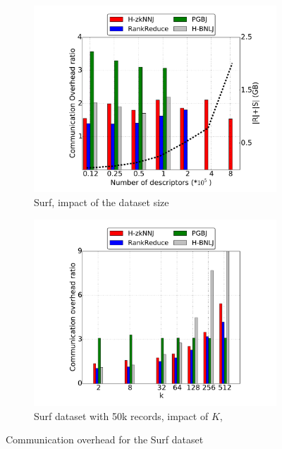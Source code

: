 \documentclass[10pt,journal,compsoc]{IEEEtran}
\begin{document}
\begin{figure}[htp]
	\centering
	\begin{subfigure}[b]{0.48\textwidth}
		\includegraphics[width=\textwidth]{img-perf/surf/data/shuffle.pdf}
		\caption{Surf, impact of the dataset size\label{fig:surf_data_shuffle}}        
	\end{subfigure}%
	\begin{subfigure}[b]{0.48\textwidth}
		\includegraphics[width=\textwidth]{img-perf/surf/k/shuffle.pdf} 
		\caption{Surf dataset with 50k records, impact of $K$,\label{fig:surf_k_shuffle}}
	\end{subfigure}%
	\caption{Communication overhead for the Surf dataset}      
\end{figure}
\end{document}
